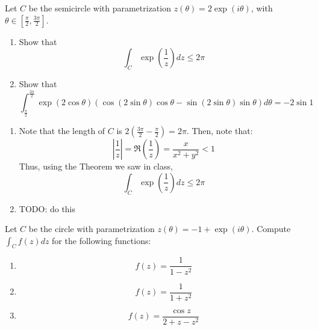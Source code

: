 \documentclass{article}
\renewcommand{\exp}[1]{\operatorname{exp}\left(#1\right)}
\begin{document}
    \begin{tcolorbox}[title=Exercise 6]
        Let $C$ be the semicircle with parametrization $z(\theta) = 2\exp{i\theta}$, with $\theta \in [\frac{\pi}{2}, \frac{3\pi}{2}]$.
        \begin{enumerate}[label=(\alph*)]
            \item Show that
            \begin{equation*}
                \int_C{\exp{\frac{1}{z}}}dz \leq 2\pi
            \end{equation*}
            \item Show that
            \begin{equation*}
                \int_{\frac{\pi}{2}}^{\frac{3\pi}{2}} \exp{2\cos{\theta}}(\cos(2\sin{\theta})\cos{\theta} - \sin(2\sin{\theta})\sin{\theta}) d\theta = -2\sin{1}
            \end{equation*}
        \end{enumerate}
    \end{tcolorbox}
    \begin{enumerate}[label=(\alph*)]
        \item Note that the length of $C$ is $2\left(\frac{3\pi}{2} - \frac{\pi}{2}\right) = 2\pi$. Then, note that:
        \begin{equation*}
            \left|\frac{1}{z}\right| = \Re\left(\frac{1}{z}\right) = \frac{x}{x^2 + y^2} < 1
        \end{equation*}
        Thus, using the Theorem we saw in class, 
        \begin{equation*}
            \int_C{\exp{\frac{1}{z}}}dz \leq 2\pi
        \end{equation*}
        \item TODO: do this
    \end{enumerate}

    \begin{tcolorbox}[title=Exercise 7]
        Let $C$ be the circle with parametrization $z(\theta) = -1 + \exp{i\theta}$. Compute $\int_C{f(z)dz}$ for the following functions:
        \begin{enumerate}[label=(\alph*)]
            \item \begin{equation*}
                f(z) = \frac{1}{1 - z^2}
            \end{equation*}
            \item \begin{equation*}
                f(z) = \frac{1}{1 + z^2}
            \end{equation*}
            \item \begin{equation*}
                f(z) = \frac{\cos{z}}{2 + z - z^2}
            \end{equation*}
        \end{enumerate}
    \end{tcolorbox}
    
\end{document}
